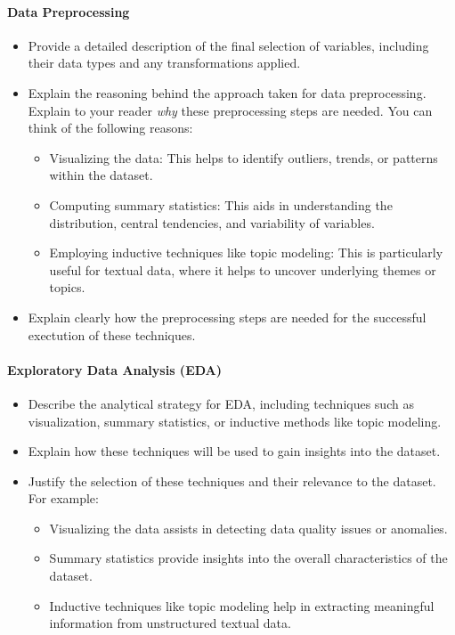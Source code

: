 \paragraph{Data Preprocessing}
\begin{itemize}
    \item Provide a detailed description of  the final selection of variables, including their data types and any transformations applied.
    \item Explain the reasoning behind the approach taken for data preprocessing. Explain to your reader \emph{why} these preprocessing steps are needed. You can think of the following reasons:
        \begin{itemize}
            \item Visualizing the data: This helps to identify outliers, trends, or patterns within the dataset.
            \item Computing summary statistics: This aids in understanding the distribution, central tendencies, and variability of variables.
            \item Employing inductive techniques like topic modeling: This is particularly useful for textual data, where it helps to uncover underlying themes or topics.
        \end{itemize}
  \item Explain clearly how the preprocessing steps are needed for the successful exectution of these techniques. 
\end{itemize}

\paragraph{Exploratory Data Analysis (EDA)}
\begin{itemize}
    \item Describe the analytical strategy for EDA, including techniques such as visualization, summary statistics, or inductive methods like topic modeling.
    \item Explain how these techniques will be used to gain insights into the dataset.
	\item Justify the selection of these techniques and their relevance to the dataset. For example:
	\begin{itemize}
		\item Visualizing the data assists in detecting data quality issues or anomalies.
		\item Summary statistics provide insights into the overall characteristics of the dataset.
		\item Inductive techniques like topic modeling help in extracting meaningful information from unstructured textual data.
	\end{itemize}
\end{itemize}

